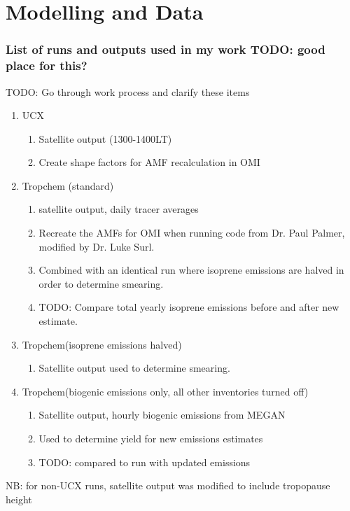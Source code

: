 
\chapter{Modelling and Data} %
\label{Model} %
  \subsection{List of runs and outputs used in my work TODO: good place for this?}
    TODO: Go through work process and clarify these items
    
    \begin{enumerate}
      \item UCX 
      \begin{enumerate}
        \item Satellite output (1300-1400LT)
        \item Create shape factors for AMF recalculation in OMI
      \end{enumerate}
      
      \item Tropchem (standard)
      \begin{enumerate}
        \item satellite output, daily tracer averages
        \item Recreate the AMFs for OMI when running code from Dr. Paul Palmer, modified by Dr. Luke Surl.
        \item Combined with an identical run where isoprene emissions are halved in order to determine smearing.
        \item TODO: Compare total yearly isoprene emissions before and after new estimate.
      \end{enumerate}
    
      \item Tropchem(isoprene emissions halved)
      \begin{enumerate}
        \item Satellite output used to determine smearing.
      \end{enumerate}
    
      \item Tropchem(biogenic emissions only, all other inventories turned off)
      \begin{enumerate}
        \item Satellite output, hourly biogenic emissions from MEGAN
        \item Used to determine yield for new emissions estimates
        \item TODO: compared to run with updated emissions
      \end{enumerate}
    \end{enumerate}
    NB: for non-UCX runs, satellite output was modified to include tropopause height
  

